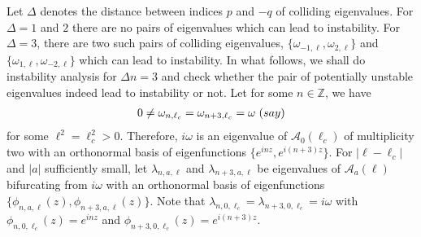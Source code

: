 \documentclass[12pt]{amsart}    %
\newcommand{\Z}{\mathbb{Z}}
\newcommand{\oned}{(1,\downarrow)}
\newcommand{\minu}{(-1,\uparrow)}
\newtheorem{lemma}[theorem]{Lemma}
\numberwithin{equation}{section}
\begin{document}
Let $\Delta$ denotes the distance between indices $p$ and $-q$ of colliding eigenvalues. For $\Delta =1$ and $2$ there are no pairs of eigenvalues which can lead to instability. For $\Delta =3$, there are two such pairs of colliding eigenvalues,  $\{\omega_{-1,\ell},\omega_{2,\ell}\}$ and $\{\omega_{1,\ell},\omega_{-2,\ell}\}$ which can lead to instability. 
In what follows, we shall do instability analysis for $\Delta n = 3$ and check whether the pair of potentially unstable eigenvalues indeed lead to instability or not.
Let for some $n\in \Z$, we have
\begin{align}
     0 \neq \omega_{n,\ell_c} = \omega_{n+3,\ell_c} = \omega \hspace{3px} (say)
\end{align}
for some $\ell^2=\ell_c^2>0$.
Therefore, $i\omega$ is an eigenvalue of $\mathcal{A}_0(\ell_c)$ of multiplicity two with an orthonormal basis of eigenfunctions $\{e^{inz},e^{i(n+3)z}\}$. For $|\ell-\ell_c|$ and $|a|$ sufficiently small, let $\lambda_{n,a,\ell}$ and $\lambda_{n+3,a,\ell}$ be eigenvalues of $\mathcal{A}_a(\ell)$ bifurcating from $i\omega$ with an orthonormal basis of eigenfunctions $\{\phi_{n,a,\ell}(z),\phi_{n+3,a,\ell}(z)\}$. Note that $\lambda_{n,0,\ell_c}=\lambda_{n+3,0,\ell_c}=i\omega$ with $\phi_{n,0,\ell_c}(z)=e^{inz}$ and $\phi_{n+3,0,\ell_c}(z)=e^{i(n+3)z}$.
\end{document}

